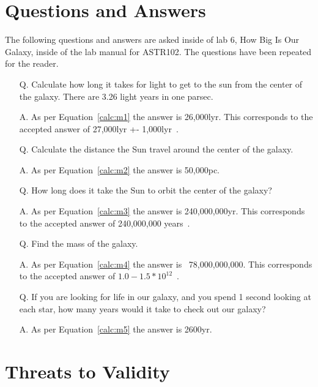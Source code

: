 \documentclass{article}
\begin{document}
\section{Questions and Answers}
\label{sec:qna}

The following questions and answers are asked inside of lab 6, How Big Is Our Galaxy,
inside of the lab manual for ASTR102. The questions have been repeated for the reader.

\begin{enumerate}

\item[Q.] Calculate how long it takes for light to get to the sun from the center of
the galaxy. There are 3.26 light years in one parsec.
\item[A.] As per Equation~\ref{calc:m1} the answer is 26,000lyr. This corresponds to
the accepted answer of 27,000lyr +- 1,000lyr~\cite{Reid:1993}.
\item[Q.] Calculate the distance the Sun travel around the center of the galaxy.
\item[A.] As per Equation~\ref{calc:m2} the answer is 50,000pc.
\item[Q.] How long does it take the Sun to orbit the center of the galaxy?
\item[A.] As per Equation~\ref{calc:m3} the answer is 240,000,000yr. This corresponds to the
accepted answer of 240,000,000 years~\cite{Hess:2002}.
\item[Q.] Find the mass of the galaxy.
\item[A.] As per Equation~\ref{calc:m4} the answer is ~78,000,000,000. This corresponds
to the accepted answer of $1.0-1.5*10^{12}$~\cite{McMillan:2011}.
\item[Q.] If you are looking for life in our galaxy, and you spend 1 second looking
at each star, how many years would it take to check out our galaxy?
\item[A.] As per Equation~\ref{calc:m5} the answer is 2600yr.

\end{enumerate}



\section{Threats to Validity}
\end{document}

